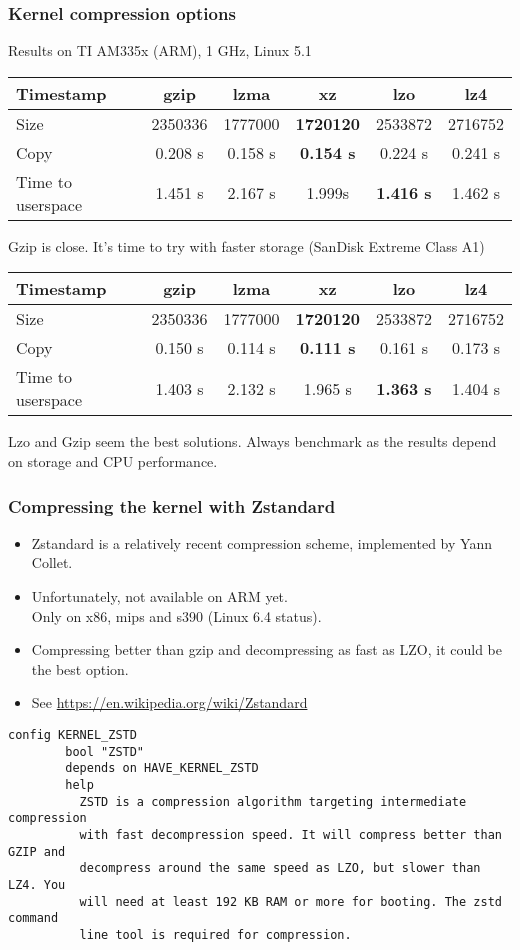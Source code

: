 \begin{frame}
\frametitle{Kernel compression options}
Results on TI AM335x (ARM), 1 GHz, Linux 5.1
{\fontsize{7}{10}\selectfont
\begin{tabular}{| l || c | c | c | c | c |}
\hline
Timestamp & gzip & lzma & xz & lzo & lz4 \\
\hline
Size & 2350336 & 1777000 & {\bf 1720120} & 2533872 & 2716752 \\
Copy & 0.208 s & 0.158 s & {\bf 0.154 s} & 0.224 s & 0.241 s \\
Time to userspace & 1.451 s & 2.167 s & 1.999s & {\bf 1.416 s} & 1.462 s \\
\hline
\end{tabular}
}
\vfill{}
Gzip is close. It's time to try with faster storage (SanDisk Extreme
Class A1)
{\fontsize{7}{10}\selectfont
\begin{tabular}{| l || c | c | c | c | c |}
\hline
Timestamp & gzip & lzma & xz & lzo & lz4 \\
\hline
Size & 2350336 & 1777000 & {\bf 1720120} & 2533872 & 2716752 \\
Copy & 0.150 s & 0.114 s & {\bf 0.111 s} & 0.161 s & 0.173 s \\
Time to userspace & 1.403 s & 2.132 s & 1.965 s & {\bf 1.363 s} & 1.404 s \\
\hline
\end{tabular}
}
\newline\newline
Lzo and Gzip seem the best solutions. Always benchmark as the results
depend on storage and CPU performance.
\end{frame}

\begin{frame}[fragile]
\frametitle{Compressing the kernel with Zstandard}
\begin{itemize}
  \item Zstandard is a relatively recent compression scheme, implemented
        by Yann Collet.
  \item Unfortunately, not available on ARM yet.\\
        Only on x86, mips and s390 (Linux 6.4 status).
  \item Compressing better than gzip and decompressing as fast as LZO,
        it could be the best option.
  \item See \url{https://en.wikipedia.org/wiki/Zstandard}
\end{itemize}
\begin{block}{}
\small
\begin{verbatim}
config KERNEL_ZSTD
        bool "ZSTD"
        depends on HAVE_KERNEL_ZSTD
        help
          ZSTD is a compression algorithm targeting intermediate compression
          with fast decompression speed. It will compress better than GZIP and
          decompress around the same speed as LZO, but slower than LZ4. You
          will need at least 192 KB RAM or more for booting. The zstd command
          line tool is required for compression.
\end{verbatim}
\end{block}
\end{frame}


